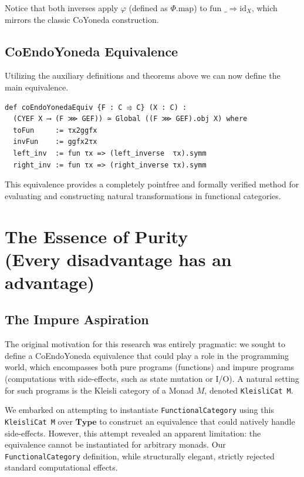 \documentclass{article}
\begin{document}
Notice that both inverses apply $\varphi$ (defined as $\Phi.\text{map}$) to 
$\text{fun } \_ \Rightarrow \text{id}_X$, which mirrors the classic CoYoneda construction.

\subsection{CoEndoYoneda Equivalence}

Utilizing the auxiliary definitions and theorems above we can now define
the main equivalence.

\vspace{6pt}
\begin{lstlisting}[basicstyle=\tiny]
def coEndoYonedaEquiv {F : C ⥤ C} (X : C) : 
  (CYEF X ⟶ (F ⋙ GEF)) ≃ Global ((F ⋙ GEF).obj X) where
  toFun     := τx2ggfx
  invFun    := ggfx2τx
  left_inv  := fun τx => (left_inverse  τx).symm
  right_inv := fun τx => (right_inverse τx).symm
\end{lstlisting}
\vspace{6pt}

This equivalence provides a completely pointfree and formally verified method for evaluating and
constructing natural transformations in functional categories.

\section{The Essence of Purity \\ (Every disadvantage has an advantage)}

\subsection{The Impure Aspiration}
The original motivation for this research was entirely pragmatic: we sought to define a
CoEndoYoneda equivalence that could play a role in the programming world, which encompasses both
pure programs (functions) and impure programs
(computations with side-effects, such as state mutation or I/O). A natural setting for such
programs is the Kleisli category of a Monad $M$, denoted \texttt{KleisliCat M}. 

We embarked on attempting to instantiate \texttt{FunctionalCategory} using this
\texttt{KleisliCat M} over $\mathbf{Type}$ to construct an equivalence that could natively
handle side-effects. However, this attempt revealed an apparent limitation: the equivalence cannot
be instantiated for arbitrary  monads. Our \texttt{FunctionalCategory} definition, while
structurally elegant, strictly rejected standard computational effects. 
\end{document}
